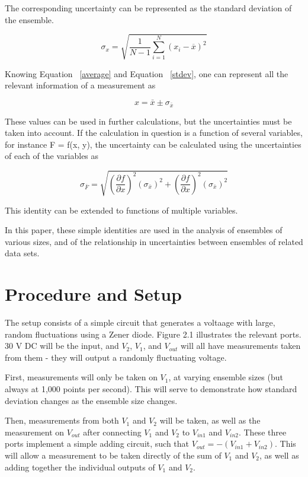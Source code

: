 \documentclass[journal]{IEEEtran}
\begin{document}
The corresponding uncertainty can be represented as the standard deviation of
the ensemble.

\begin{equation}
\label{stdev}
\sigma _x = \sqrt{\frac{1}{N-1} \sum_{i=1}^N (x_i - \overline{x})^2}
\end{equation}

Knowing Equation ~\ref{average} and Equation ~\ref{stdev}, one can represent
all the relevant information of a measurement as 

\begin{equation}
\label{measurement}
x = \bar x \pm \sigma _{\bar x}
\end{equation}

These values can be used in further calculations, but the uncertainties must be
taken into account. If the calculation in question is a function of several
variables, for instance F = f(x, y), the uncertainty can be calculated using
the uncertainties of each of the variables as

\begin{equation}
\label{propogation}
\sigma _{\bar F} = \sqrt{ \left( \frac{\partial f}{\partial x} \right)^2 \left(
\sigma _{\bar x} \right)^2 + \left( \frac{\partial f}{\partial x} \right)^2
\left( \sigma _{\bar x}\right)^2}
\end{equation}

This identity can be extended to functions of multiple variables.

In this paper, these simple identities are used in the analysis of ensembles of
various sizes, and of the relationship in uncertainties between ensembles of
related data sets.

\section{Procedure and Setup}

The setup consists of a simple circuit that generates a voltaage with large,
random fluctuations using a Zener diode. Figure 2.1 illustrates the relevant
ports. 30 V DC will be the input, and $V_2$, $V_1$, and $V_{out}$ will all have
measurements taken from them - they will output a randomly fluctuating voltage.

First, measurements will only be taken on $V_1$, at varying ensemble sizes (but
always at 1,000 points per second). This will serve to demonstrate how standard
deviation changes as the ensemble size changes.

Then, measurements from both $V_1$ and $V_2$ will be taken, as well as the
measurement on $V_{out}$ after connecting $V_1$ and $V_2$ to $V_{in1}$ and
$V_{in2}$. These three ports implement a simple adding circuit, such that
$V_{out} = -(V_{in1} + V_{in2})$. This will allow a measurement to be taken
directly of the sum of $V_1$ and $V_2$, as well as adding together the
individual outputs of $V_1$ and $V_2$.
\end{document}
